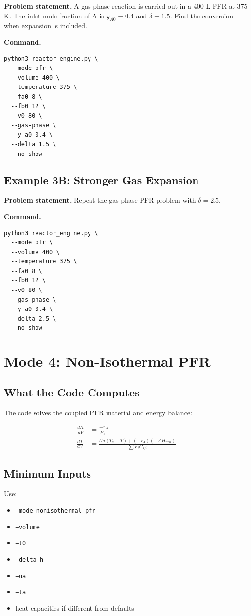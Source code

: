 \documentclass[11pt]{article}
\begin{document}
\textbf{Problem statement.} A gas-phase reaction is carried out in a 400 L PFR at 375 K. The inlet mole fraction of A is $y_{A0}=0.4$ and $\delta=1.5$. Find the conversion when expansion is included.

\textbf{Command.}

\begin{lstlisting}
python3 reactor_engine.py \
  --mode pfr \
  --volume 400 \
  --temperature 375 \
  --fa0 8 \
  --fb0 12 \
  --v0 80 \
  --gas-phase \
  --y-a0 0.4 \
  --delta 1.5 \
  --no-show
\end{lstlisting}

\subsection{Example 3B: Stronger Gas Expansion}

\textbf{Problem statement.} Repeat the gas-phase PFR problem with $\delta=2.5$.

\textbf{Command.}

\begin{lstlisting}
python3 reactor_engine.py \
  --mode pfr \
  --volume 400 \
  --temperature 375 \
  --fa0 8 \
  --fb0 12 \
  --v0 80 \
  --gas-phase \
  --y-a0 0.4 \
  --delta 2.5 \
  --no-show
\end{lstlisting}

\section{Mode 4: Non-Isothermal PFR}

\subsection{What the Code Computes}

The code solves the coupled PFR material and energy balance:

\begin{align}
\frac{dX}{dV} &= \frac{-r_A}{F_{A0}} \\
\frac{dT}{dV} &= \frac{Ua(T_a-T)+(-r_A)(-\Delta H_{rxn})}{\sum F_i C_{p,i}}
\end{align}

\subsection{Minimum Inputs}

Use:

\begin{itemize}
    \item \texttt{--mode nonisothermal-pfr}
    \item \texttt{--volume}
    \item \texttt{--t0}
    \item \texttt{--delta-h}
    \item \texttt{--ua}
    \item \texttt{--ta}
    \item heat capacities if different from defaults
\end{itemize}
\end{document}
